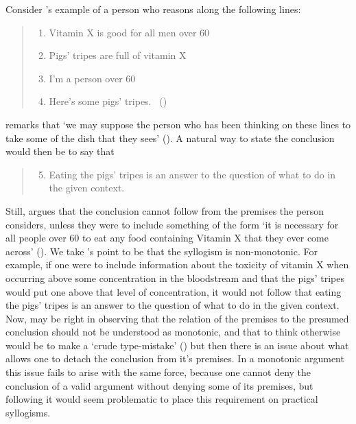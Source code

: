 \documentclass[10pt]{article}
\begin{document}
Consider \citeauthor{Anscombe:1957aa}'s example of a person who reasons along the following lines:
\begin{quote}
  \begin{enumerate}
  \item\label{aps:1} Vitamin X is good for all men over 60
  \item\label{aps:2} Pigs' tripes are full of vitamin X
  \item\label{aps:3} I'm a person over 60
  \item\label{aps:4} Here's some pigs' tripes.\nolinebreak
\mbox{ }\hfill(\citeyear[60]{Anscombe:1957aa})
  \end{enumerate}
\end{quote}
\citeauthor{Anscombe:1957aa} remarks that `we may suppose the person who has been thinking on these lines to take some of the dish that they sees' (\citeyear[60]{Anscombe:1957aa}).
A natural way to state the conclusion would then be to say that
\begin{quote}
  \begin{enumerate}[resume]
    \setcounter{enumi}{4}
  \item\label{aps:5} Eating the pigs' tripes is an answer to the question of what to do in the given context.
  \end{enumerate}
\end{quote}
Still, \citeauthor{Anscombe:1957aa} argues that the conclusion cannot follow from the premises the person considers, unless they were to include something of the form `it is necessary for all people over 60 to eat any food containing Vitamin X that they ever come across' (\citeyear[61]{Anscombe:1957aa}).
We take \citeauthor{Anscombe:1957aa}'s point to be that the syllogism is non-monotonic.
For example, if one were to include information about the toxicity of vitamin X when occurring above some concentration in the bloodstream and that the pigs' tripes would put one above that level of concentration, it would not follow that eating the pigs' tripes is an answer to the question of what to do in the given context.
Now, \citeauthor{Mothersill:1962aa} may be right in observing that the relation of the premises to the presumed conclusion should not be understood as monotonic, and that to think otherwise would be to make a `crude type-mistake' (\citeyear[453]{Mothersill:1962aa}) but then there is an issue about what allows one to detach the conclusion from it's premises.
In a monotonic argument this issue fails to arise with the same force, because one cannot deny the conclusion of a valid argument without denying some of its premises, but following \citeauthor{Anscombe:1957aa} it would seem problematic to place this requirement on practical syllogisms.
\end{document}
